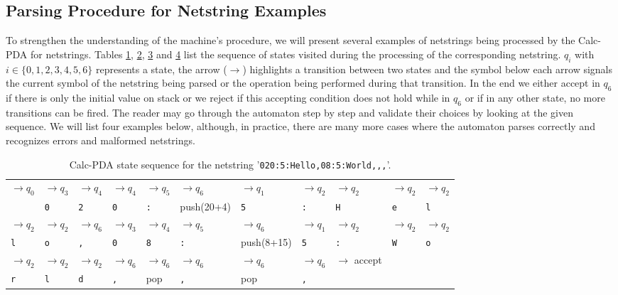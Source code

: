 \subsection{Parsing Procedure for Netstring Examples}
\label{4.4}
To strengthen the understanding of the machine's procedure, we will present several examples of netstrings being processed by the Calc-PDA for netstrings. Tables \hyperref[tab:tab1-netstring-1-Calc-pda-state-sequence]{1}, \hyperref[tab:tab2-netstring-2-Calc-pda-state-sequence]{2}, \hyperref[tab:tab3-netstring-3-Calc-pda-state-sequence]{3} and \hyperref[tab:tab4-netstring-4-Calc-pda-state-sequence]{4} list the sequence of states visited during the processing of the corresponding netstring. $q_i$ with $i \in \{0,1,2,3,4,5,6\}$ represents a state, the arrow ($\rightarrow$) highlights a transition between two states and the symbol below each arrow signals the current symbol of the netstring being parsed or the operation being performed during that transition. In the end we either accept in $q_6$ if there is only  the initial value on stack or we reject if this accepting condition does not hold while in $q_6$ or if in any other state, no more transitions can be fired. The reader may go through the automaton step by step and validate their choices by looking at the given sequence. We will list four examples below, although, in practice, there are many more cases where the automaton parses correctly and recognizes errors and malformed netstrings.\\
\begin{table}
    \centering
    \begin{tabular}{|lllllllllll|}\hline
         $\rightarrow q_0$ &$\rightarrow q_3$ & $\rightarrow q_4$ & $\rightarrow q_4$ & $\rightarrow q_5$ & $\rightarrow q_6$ & $\rightarrow q_1$ & $\rightarrow q_2$ & $\rightarrow q_2$ & $\rightarrow q_2$ & $\rightarrow q_2$  \\
        & \texttt{0} &\texttt{2} &\texttt{0} &\texttt{:} & \tiny{push(20+4)} & \texttt{5}&\texttt{:} & \texttt{H} & \texttt{e} & \texttt{l}\\[10pt]\hline
        $\rightarrow q_2$ &$\rightarrow q_2$ &$\rightarrow q_6$ &$\rightarrow q_3$&$\rightarrow q_4$ &$\rightarrow q_5$ &$\rightarrow q_6$ &$\rightarrow q_1$ &$\rightarrow q_2$ &$\rightarrow q_2$ &$\rightarrow q_2$\\
         \texttt{l} & \texttt{o} & \texttt{,} & \texttt{0} & \texttt{8} & \texttt{:}& \tiny{push(8+15)} & \texttt{5}& \texttt{:}& \texttt{W} & \texttt{o} \\[10pt]\hline
        $\rightarrow q_2$ &$\rightarrow q_2$ &$\rightarrow q_2$ &$\rightarrow q_6$ &$\rightarrow q_6$ &$\rightarrow q_6$ &$\rightarrow q_6$ &$\rightarrow q_6$ & $\rightarrow$ \tiny{accept} & & \\
        \texttt{r} & \texttt{l} & \texttt{d} & \texttt{,} & \tiny{pop} & \texttt{,}& \tiny{pop} & \texttt{,}  &  & \\[10pt]\hline
    \end{tabular}
    \caption{Calc-PDA state sequence for the netstring '\texttt{020:5:Hello,08:5:World,,,}'.}
    \label{tab:tab1-netstring-1-Calc-pda-state-sequence}
\end{table}

